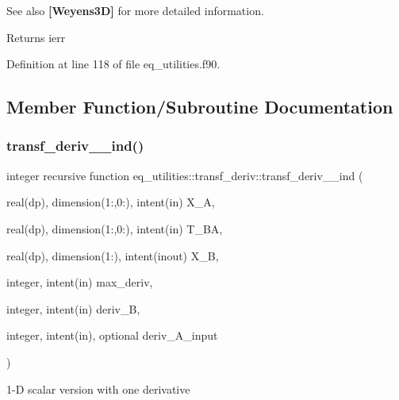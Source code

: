 \begin{DoxySeeAlso}{See also}
{\bfseries [Weyens3D]} for more detailed information.
\end{DoxySeeAlso}
\begin{DoxyReturn}{Returns}
ierr 
\end{DoxyReturn}


Definition at line 118 of file eq\+\_\+utilities.\+f90.



\subsection{Member Function/\+Subroutine Documentation}
\mbox{\label{interfaceeq__utilities_1_1transf__deriv_ae0caaaa6fbd6d68f926921b7565ca727}} 
\subsubsection{\texorpdfstring{transf\+\_\+deriv\+\_\+\_\+ind()}{transf\_deriv\_1\_ind()}}
{\footnotesize\ttfamily integer recursive function eq\+\_\+utilities\+::transf\+\_\+deriv\+::transf\+\_\+deriv\+\_\+\_\+ind (\begin{DoxyParamCaption}\item[{real(dp), dimension(1\+:,0\+:), intent(in)}]{X\+\_\+A,  }\item[{real(dp), dimension(1\+:,0\+:), intent(in)}]{T\+\_\+\+BA,  }\item[{real(dp), dimension(1\+:), intent(inout)}]{X\+\_\+B,  }\item[{integer, intent(in)}]{max\+\_\+deriv,  }\item[{integer, intent(in)}]{deriv\+\_\+B,  }\item[{integer, intent(in), optional}]{deriv\+\_\+\+A\+\_\+input }\end{DoxyParamCaption})}



1-\/D scalar version with one derivative 


